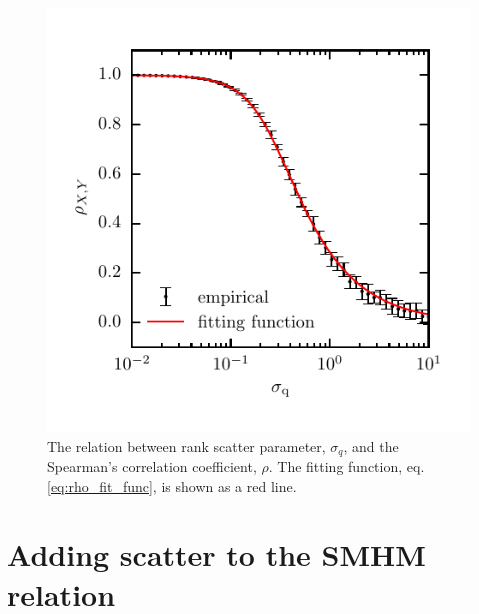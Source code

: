 \documentclass[a4paper,fleqn,usenatbib]{mnras}
\begin{document}
%
\begin{figure}
\includegraphics[]{figures/rho_sigma.pdf}
\caption{The relation between rank scatter parameter, $\sigma_q$, and the Spearman's correlation coefficient, $\rho$.  The fitting function, eq. \ref{eq:rho_fit_func}, is shown as a red line.}
\label{fig:rho_sigma}
\end{figure}
%

\section{Adding scatter to the SMHM relation}
\label{sec:scatter}

\bsp	%
\label{lastpage}
\end{document}
